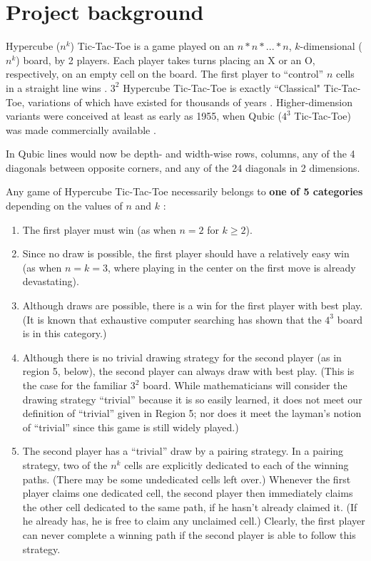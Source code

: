 \documentclass[english, 11pt]{article}
\begin{document}
\section*{Project background}

Hypercube ($n^k$) Tic-Tac-Toe is a game played on an $n*n*...*n$, $k$-dimensional ($n^k$) board, by 2 players. Each player takes turns placing an X or an O, respectively, on an empty cell on the board. The first player to “control” $n$ cells in a straight line wins \cite{golomb}. $3^2$ Hypercube Tic-Tac-Toe is exactly ``Classical" Tic-Tac-Toe, variations of which have existed for thousands of years \cite{marla}. Higher-dimension variants were conceived at least as early as 1955, when Qubic ($4^3$ Tic-Tac-Toe) was made commercially available \cite{55}.

In Qubic lines would now be depth- and width-wise rows, columns, any of the 4 diagonals between opposite corners, and any of the 24 diagonals in 2 dimensions.

Any game of Hypercube Tic-Tac-Toe necessarily belongs to \textbf{one of 5 categories} depending on the values of $n$ and $k$ \cite{golomb}:
\begin{displayquote}
	\begin{enumerate}
		\item The first player must win (as when $n=2$ for $k \geq 2$).
		\item Since no draw is possible, the first player should have a relatively easy win
		(as when $n = k = 3$, where playing in the center on the first move is already
		devastating).
		\item Although draws are possible, there is a win for the first player with best play.
		(It is known that exhaustive computer searching has shown that the $4^3$
		board is in this category.)
		\item Although there is no trivial drawing strategy for the second player (as in
		region 5, below), the second player can always draw with best play. (This is
		the case for the familiar $3^2$ board. While mathematicians will consider the
		drawing strategy “trivial” because it is so easily learned, it does not meet our
		definition of “trivial” given in Region 5; nor does it meet the layman's notion
		of “trivial” since this game is still widely played.)
		\item The second player has a “trivial” draw by a pairing strategy. In a pairing
		strategy, two of the $n^k$ cells are explicitly dedicated to each of the
		winning paths. (There may be some undedicated cells left over.)
		Whenever the first player claims one dedicated cell, the second player then
		immediately claims the other cell dedicated to the same path, if he hasn't
		already claimed it. (If he already has, he is free to claim any unclaimed cell.)
		Clearly, the first player can never complete a winning path if the second player
		is able to follow this strategy.
	\end{enumerate}
\end{displayquote}
\end{document}
